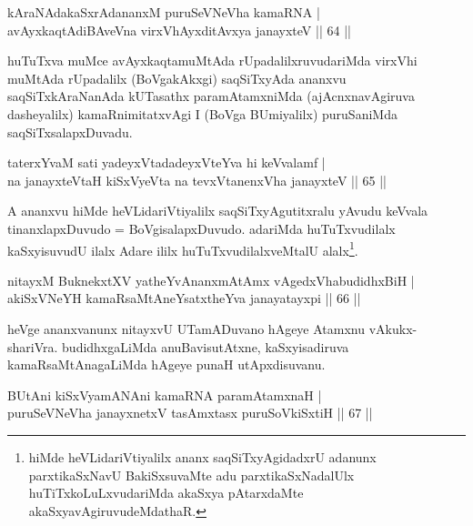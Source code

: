 \begin{shl}
kAraNAdakaSxrAdananxM puruSeVNeVha kamaRNA |\\
avAyxkaqtAdiBAveVna virxVhAyxditAvxya janayxteV \hfill || 64 ||
\end{shl}

\begin{artha}
huTuTxva muMce avAyxkaqtamuMtAda rUpadalilxruvudariMda virxVhi muMtAda rUpadalilx (BoVgakAkxgi) saqSiTxyAda ananxvu saqSiTxkAraNanAda kUTasathx paramAtamxniMda (ajAcnxnavAgiruva dasheyalilx) kamaRnimitatxvAgi I (BoVga BUmiyalilx) puruSaniMda saqSiTxsalapxDuvadu.
\end{artha}


\begin{shl}
taterxYvaM sati yadeyxVtadadeyxVteYva hi keVvalamf |\\
na janayxteV\s taH kiSxVyeVta na tevxVtanenxVha janayxteV \hfill || 65 ||
\end{shl}

\begin{artha}
A ananxvu hiMde heVLidariVtiyalilx saqSiTxyAgutitxralu yAvudu keVvala tinanxlapxDuvudo = BoVgisalapxDuvudo. adariMda huTuTxvudilalx kaSxyisuvudU ilalx Adare ililx huTuTxvudilalxveMtalU alalx\footnote{hiMde heVLidariVtiyalilx ananx saqSiTxyAgidadxrU adanunx parxtikaSxNavU BakiSxsuvaMte adu parxtikaSxNadalUlx huTiTxkoLuLxvudariMda akaSxya pAtarxdaMte akaSxyavAgiruvudeMdathaR.}.
\end{artha}


\begin{shl}
nitayxM BuknekxtXV yatheYvAnanxmAtAmx vAgedxVhabudidhxBiH |\\
akiSxVNeYH kamaRsaMtAneYsatxtheYva janayatayxpi \hfill || 66 ||
\end{shl}

\begin{artha}
heVge ananxvanunx nitayxvU UTamADuvano hAgeye Atamxnu vAkukx-shariVra. budidhxgaLiMda 
anuBavisutAtxne, kaSxyisadiruva kamaRsaMtAnagaLiMda hAgeye punaH utApxdisuvanu.
\end{artha}


\begin{shl}
BUtAni kiSxVyamANAni kamaRNA paramAtamxnaH |\\
puruSeVNeVha janayxnetxV tasAmxtasx puruSoV\s kiSxtiH \hfill || 67 ||
\end{shl}

